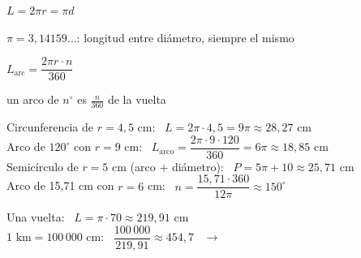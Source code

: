 \documentclass[11pt,a4paper]{article}
\begin{document}
\vfill
\begin{tcbraster}[raster columns=2,raster equal height,raster column skip=10pt]
\begin{tcolorbox}[enhanced,colback=fmyellow!18,colframe=fmgold,arc=4mm,boxrule=1.6pt,before upper=\centering]
{\Large$L=2\pi r=\pi d$}\par\smallskip
{\small $\pi=3{,}14159\dots$: longitud entre diámetro, siempre el mismo}
\end{tcolorbox}
\begin{tcolorbox}[enhanced,colback=fmyellow!18,colframe=fmgold,arc=4mm,boxrule=1.6pt,before upper=\centering]
{\Large$L_{\text{arc}}=\dfrac{2\pi r\cdot n}{360}$}\par\smallskip
{\small un arco de $n^\circ$ es $\frac{n}{360}$ de la vuelta}
\end{tcolorbox}
\end{tcbraster}

\vfill
\begin{exemple}[Ejemplos]
Circunferencia de $r=4{,}5$ cm: \ $L=2\pi\cdot4{,}5=9\pi\approx\boxed{28{,}27\text{ cm}}$\\[5pt]
Arco de $120^\circ$ con $r=9$ cm: \ $L_{\text{arco}}=\dfrac{2\pi\cdot9\cdot120}{360}=6\pi\approx\boxed{18{,}85\text{ cm}}$\\[5pt]
Semicírculo de $r=5$ cm (arco $+$ diámetro): \ $P=5\pi+10\approx\boxed{25{,}71\text{ cm}}$\\[5pt]
Arco de 15,71 cm con $r=6$ cm: \ $n=\dfrac{15{,}71\cdot360}{12\pi}\approx\boxed{150^\circ}$
\end{exemple}

\vfill
\begin{exemple}
\begin{minipage}[c]{0.2\linewidth}\centering
{}
\end{minipage}\hfill
\begin{minipage}[c]{0.77\linewidth}
Una vuelta: \ $L=\pi\cdot70\approx219{,}91$ cm\\[3pt]
$1\text{ km}=100\,000$ cm: \ $\dfrac{100\,000}{219{,}91}\approx454{,}7$ \ $\to$ \ 
\end{minipage}
\end{exemple}
\end{document}
